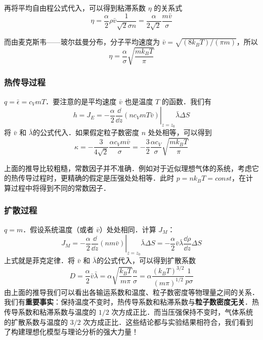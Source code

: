 再将平均自由程公式代入，可以得到粘滞系数 $\eta$ 的关系式
\begin{equation}
\eta = \frac{\alpha}{2}\rho\bar v \frac{1}{\sqrt{2}\sigma n}=\frac{\alpha}{2\sqrt{2}}\frac{m \bar v}{\sigma}
\end{equation}

而由麦克斯韦——玻尔兹曼分布，分子平均速度为 $\bar v=\sqrt{(8k_BT)/(\pi m)}$，所以
\begin{equation}
\eta = \frac{\alpha}{\sigma}\sqrt{\frac{mk_BT}{\pi}}
\end{equation}

\subsubsection{热传导过程}
$q=\bar \epsilon = c_VmT$．要注意的是平均速度 $\bar v$ 也是温度 $T$ 的函数．我们有
\begin{equation}
h=J_E=-\frac{\alpha}{2}\left.\frac{\dd }{\dd z}(nc_VmT\bar v)\right|_{z=z_0} \bar\lambda \Delta S
\end{equation}
将 $\bar v$ 和 $\bar\lambda$的公式代入．如果假定粒子数密度 $n$ 处处相等，可以得到
\begin{equation}
\kappa=-\frac{3}{4\sqrt{2}}\frac{\alpha c_Vm\bar v}{\sigma}=-\frac{3}{2}\frac{\alpha c_V}{\sigma}\sqrt{\frac{mk_BT}{\pi}}
\end{equation}

上面的推导比较粗糙，常数因子并不准确．例如对于近似理想气体的系统，考虑它的热传导过程时，更精确的假定是压强处处相等．此时 $p=nk_BT=const$，在计算过程中将得到不同的常数因子．
\subsubsection{扩散过程}
$q=m$．假设系统温度（或者 $\bar v$）处处相同．计算 $J_M$：
\begin{equation}
J_M=-\frac{\alpha}{2}\left.\frac{\dd }{\dd z}(nm\bar v)\right|_{z=z_0}\bar\lambda \Delta S = -\frac{\alpha}{2}\bar v\bar\lambda \frac{\dd \rho}{\dd z}\Delta S
\end{equation}
上式就是菲克定律．将 $\bar v$ 和 $\bar\lambda$的公式代入，可以得到扩散系数
\begin{equation}
D=\frac{\alpha}{2}\bar v\bar \lambda = \alpha\sqrt{\frac{k_BT}{m\pi}}\frac{n}{\sigma} =  \alpha\frac{(k_B T)^{3/2}}{(m\pi)^{1/2}}\frac{1}{p\sigma}
\end{equation}
由上面的推导我们可以看出各输运系数和温度、粒子数密度等物理量之间的关系．我们有\textbf{重要事实}：保持温度不变时，热传导系数和粘滞系数与\textbf{粒子数密度无关}．热传导系数和粘滞系数与温度的 $1/2$ 次方成正比．而当压强保持不变时，气体系统的扩散系数与温度的 $3/2$ 次方成正比．这些结论都与实验结果相符合，我们看到了构建理想化模型与理论分析的强大力量！